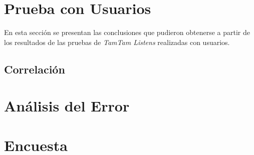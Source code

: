 \section{Prueba con Usuarios}
\label{sec:prueba}

En esta sección se presentan las conclusiones que pudieron obtenerse a partir de los
resultados de las pruebas de \emph{TamTam Listens} realizadas con usuarios.

\subsection{Correlación}
\section{An\'alisis del Error}
\section{Encuesta}

